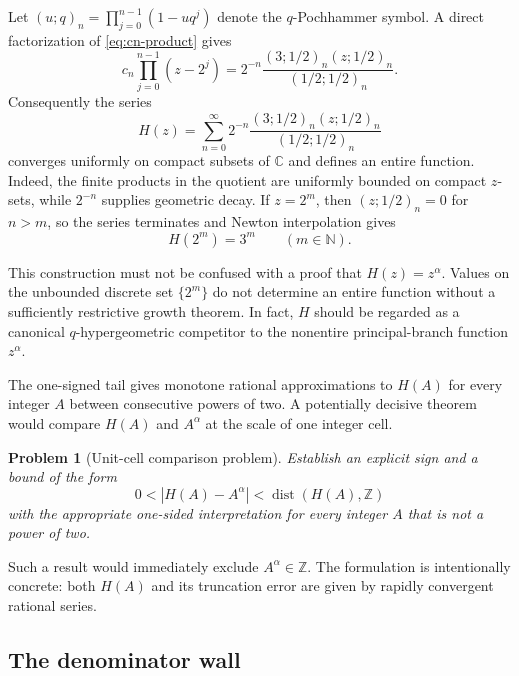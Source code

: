 \documentclass[11pt]{article}
\newtheorem{problem}[theorem]{Problem}
\theoremstyle{definition}
\newcommand{\N}{\mathbb N}
\newcommand{\Z}{\mathbb Z}
\newcommand{\C}{\mathbb C}
\newcommand{\dist}{\operatorname{dist}}
\begin{document}
Let $(u;q)_n=\prod_{j=0}^{n-1}(1-uq^j)$ denote the $q$-Pochhammer symbol.  A direct factorization of \eqref{eq:cn-product} gives
\begin{equation}\label{eq:qpoch-term}
 c_n\prod_{j=0}^{n-1}(z-2^j)
 =2^{-n}\frac{(3;1/2)_n(z;1/2)_n}{(1/2;1/2)_n}.
\end{equation}
Consequently the series
\begin{equation}\label{eq:H}
 H(z)=\sum_{n=0}^{\infty}2^{-n}
 \frac{(3;1/2)_n(z;1/2)_n}{(1/2;1/2)_n}
\end{equation}
converges uniformly on compact subsets of $\C$ and defines an entire function.  Indeed, the finite products in the quotient are uniformly bounded on compact $z$-sets, while $2^{-n}$ supplies geometric decay.  If $z=2^m$, then $(z;1/2)_n=0$ for $n>m$, so the series terminates and Newton interpolation gives
\begin{equation}\label{eq:H-interp}
 H(2^m)=3^m\qquad(m\in\N).
\end{equation}

This construction must not be confused with a proof that $H(z)=z^\alpha$.  Values on the unbounded discrete set $\{2^m\}$ do not determine an entire function without a sufficiently restrictive growth theorem.  In fact, $H$ should be regarded as a canonical $q$-hypergeometric competitor to the nonentire principal-branch function $z^\alpha$.

The one-signed tail gives monotone rational approximations to $H(A)$ for every integer $A$ between consecutive powers of two.  A potentially decisive theorem would compare $H(A)$ and $A^\alpha$ at the scale of one integer cell.

\begin{problem}[Unit-cell comparison problem]\label{prob:unit-cell}
Establish an explicit sign and a bound of the form
\[
 0<|H(A)-A^\alpha|<\dist(H(A),\Z)
\]
with the appropriate one-sided interpretation for every integer $A$ that is not a power of two.
\end{problem}

Such a result would immediately exclude $A^\alpha\in\Z$.  The formulation is intentionally concrete: both $H(A)$ and its truncation error are given by rapidly convergent rational series.

\subsection{The denominator wall}
\end{document}
